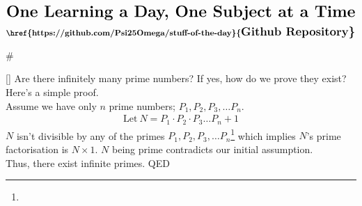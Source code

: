 \documentclass{article}
\begin{document}
\sffamily
\newenvironment{mathbox}[1][2]
{
  \vspace{1em}
  \begin{tcolorbox}[colback=yellow!50!white, colframe=yellow!60!red, title=#1]
  #
}
{
  \end{tcolorbox}
}
\newenvironment{phybox}[1][2]
{
  \vspace{1em}
  \begin{tcolorbox}[colback=blue!30!white, colframe=blue!80!white, title=#1]
  #
}
{
  \end{tcolorbox}
}
\newenvironment{chembox}[1][2]
{
  \vspace{1em}
  \begin{tcolorbox}[colback=red!30!white, colframe=red!90!white, title=#1]
  #
}
{
  \end{tcolorbox}
}
\newenvironment{biobox}[1][2]
{
  \vspace{1em}
  \begin{tcolorbox}[colback=green!30!white, colframe=ForestGreen!70!green, title=#1]
  #
}
{
  \end{tcolorbox}
}
\sffamily
\begin{align*}
    \textbf{\LARGE{One Learning a Day, One Subject at a Time}}
\end{align*}
\begin{align*}
\textbf{{\href{https://github.com/Psi25Omega/stuff-of-the-day}{\Large{Github Repository}}}}
\end{align*}
\begin{mathbox}
[]
Are there {infinitely many prime numbers}? If yes, how do we prove they exist?\\
Here's a simple proof.\\
{Assume} we have only $n$ prime numbers; $P_1, P_2, P_3, \dots P_n$.
\begin{align*}
\text{Let}~N = P_1 \cdot P_2 \cdot P_3 \dots P_n + 1
\end{align*}
$N$ {isn't divisible} by any of the primes $P_1, P_2, P_3, \dots P_n$\footnote{}  which implies $N$'s {prime factorisation} is $N \times 1$. $N$ being prime {contradicts} our initial assumption.\\
Thus, there exist infinite primes. QED
\end{mathbox}
\end{document}
